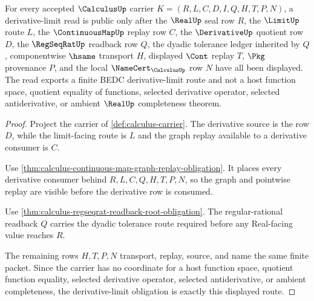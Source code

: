 \begin{theorem}
\label{thm:calculus-derivative-limit-obligation}
For every accepted $\CalculusUp$ carrier $K=(R,L,C,D,I,Q,H,T,P,N)$, a derivative-limit read is public only after the $\RealUp$ seal row $R$, the $\LimitUp$ route $L$, the $\ContinuousMapUp$ replay row $C$, the $\DerivativeUp$ quotient row $D$, the $\RegSeqRatUp$ readback row $Q$, the dyadic tolerance ledger inherited by $Q$, componentwise $\hsame$ transport $H$, displayed $\Cont$ replay $T$, $\Pkg$ provenance $P$, and the local $\NameCert_{\CalculusUp}$ row $N$ have all been displayed. The read exports a finite BEDC derivative-limit route and not a host function space, quotient equality of functions, selected derivative operator, selected antiderivative, or ambient $\RealUp$ completeness theorem.
\end{theorem}
\begin{proof}
Project the carrier of \autoref{def:calculus-carrier}. The derivative source is the row $D$, while the limit-facing route is $L$ and the graph replay available to a derivative consumer is $C$.

Use \autoref{thm:calculus-continuous-map-graph-replay-obligation}. It places every derivative consumer behind $R,L,C,Q,H,T,P,N$, so the graph and pointwise replay are visible before the derivative row is consumed.

Use \autoref{thm:calculus-regseqrat-readback-root-obligation}. The regular-rational readback $Q$ carries the dyadic tolerance route required before any Real-facing value reaches $R$.

The remaining rows $H,T,P,N$ transport, replay, source, and name the same finite packet. Since the carrier has no coordinate for a host function space, quotient function equality, selected derivative operator, selected antiderivative, or ambient completeness, the derivative-limit obligation is exactly this displayed route.
\end{proof}

